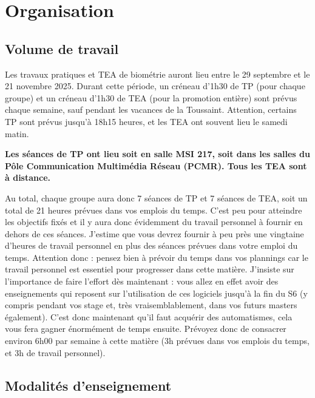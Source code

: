 \documentclass[
  french,
  a4paper,
  DIV=11,
  numbers=noendperiod,
  oneside]{scrreprt}
\begin{document}
\section*{Organisation}\label{organisation}


\subsection*{Volume de travail}\label{volume-de-travail}

Les travaux pratiques et TEA de biométrie auront lieu entre le 29
septembre et le 21 novembre 2025. Durant cette période, un créneau
d'1h30 de TP (pour chaque groupe) et un créneau d'1h30 de TEA (pour la
promotion entière) sont prévus chaque semaine, sauf pendant les vacances
de la Toussaint. Attention, certains TP sont prévus jusqu'à 18h15
heures, et les TEA ont souvent lieu le samedi matin.

\textbf{Les séances de TP ont lieu soit en salle MSI 217, soit dans les
salles du Pôle Communication Multimédia Réseau (PCMR). Tous les TEA sont
à distance.}

Au total, chaque groupe aura donc 7 séances de TP et 7 séances de TEA,
soit un total de 21 heures prévues dans vos emplois du temps. C'est peu
pour atteindre les objectifs fixés et il y aura donc évidemment du
travail personnel à fournir en dehors de ces séances. J'estime que vous
devrez fournir à peu près une vingtaine d'heures de travail personnel en
plus des séances prévues dans votre emploi du temps. Attention donc :
pensez bien à prévoir du temps dans vos plannings car le travail
personnel est essentiel pour progresser dans cette matière. J'insiste
sur l'importance de faire l'effort dès maintenant : vous allez en effet
avoir des enseignements qui reposent sur l'utilisation de ces logiciels
jusqu'à la fin du S6 (y compris pendant vos stage et, très
vraisemblablement, dans vos futurs masters également). C'est donc
maintenant qu'il faut acquérir des automatismes, cela vous fera gagner
énormément de temps ensuite. Prévoyez donc de consacrer environ 6h00 par
semaine à cette matière (3h prévues dans vos emplois du temps, et 3h de
travail personnel).

\subsection*{Modalités d'enseignement}\label{modalituxe9s-denseignement}
\end{document}
